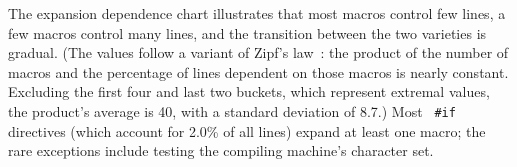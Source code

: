 \documentclass[10pt]{article}
\begin{document}
The expansion dependence chart illustrates that most macros control few
lines, a few macros control many lines, and the transition between the two
varieties is gradual.  (The values follow a variant of Zipf's
law~\cite{Zipf49}:  the product of the number of macros and the percentage
of lines dependent on those macros is nearly constant.  Excluding the first
four and last two buckets, which represent extremal values, the
product's average is 40, with a standard deviation of 8.7.)  Most {\tt
\#if} directives (which account for 2.0\% of all lines) expand at
least one macro; the rare exceptions include testing the compiling
machine's character set.




%
%
%
\end{document}
